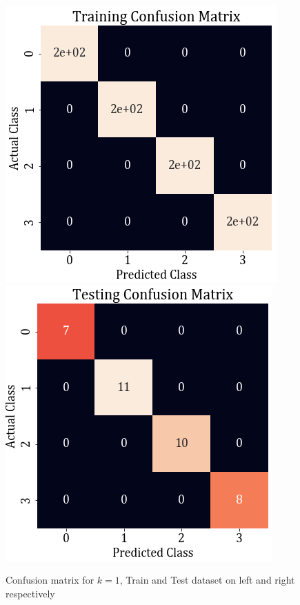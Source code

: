 \documentclass[11pt,a4paper]{article}
\begin{document}
\begin{figure}[H]
    \centering
    \includegraphics[scale=0.55]{images/1A/1A_cm_knn_train.png}
    \includegraphics[scale=0.55]{images/1A/1A_cm_knn_test.png}
    \caption{Confusion matrix for $k=1$, Train and Test dataset on left and right respectively}
    \label{fig:1A_cm_KNN}
\end{figure}
\end{document}
